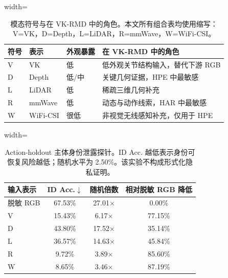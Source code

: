 ﻿\begin{table}[H]
\centering
\caption{模态符号与在 VK-RMD 中的角色。本文所有组合表均使用缩写：V=VK，D=Depth，L=LiDAR，R=mmWave，W=WiFi-CSI。}
\label{tab:notation_cn}
\scriptsize
\begin{adjustbox}{width=\linewidth}
\begin{tabular}{llll}
\toprule
符号 & 表示 & 外观暴露 & 在 VK-RMD 中的角色 \\
\midrule
V & VK & 低 & 低外观关节结构输入，替代下游 RGB \\
D & Depth & 低/中 & 关键几何证据，HPE 中最敏感 \\
L & LiDAR & 低 & 稀疏三维几何补充 \\
R & mmWave & 低 & 动态与动作线索，HAR 中最敏感 \\
W & WiFi-CSI & 很低 & 非视觉无线感知补充，仅用于 HPE \\
\bottomrule
\end{tabular}
\end{adjustbox}
\end{table}


\begin{table}[H]
\centering
\caption{Action-holdout 主体身份泄露探针。ID Acc. 越低表示身份可恢复风险越低；随机水平为 2.50\%。该实验不构成形式化隐私证明。}
\label{tab:leakage_probe_rebuilt}
\scriptsize
\begin{adjustbox}{width=\linewidth}
\begin{tabular}{lccc}
\toprule
输入表示 & ID Acc.$\downarrow$ & 随机倍数 & 相对脱敏 RGB 降低 \\
\midrule
脱敏 RGB & 67.53\% & 27.01$\times$ & 0.00\% \\
V & 15.43\% & 6.17$\times$ & 77.15\% \\
D & 43.80\% & 17.52$\times$ & 35.14\% \\
L & 36.57\% & 14.63$\times$ & 45.84\% \\
R & 9.72\% & 3.89$\times$ & 85.60\% \\
W & 8.65\% & 3.46$\times$ & 87.19\% \\
\bottomrule
\end{tabular}
\end{adjustbox}
\end{table}


